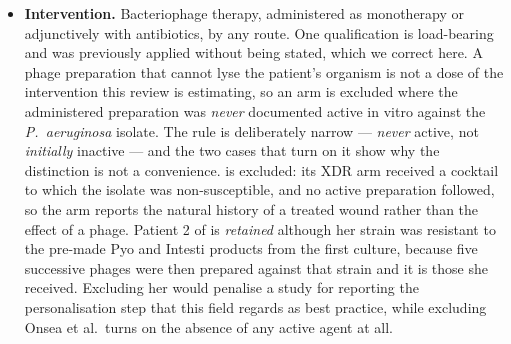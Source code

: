 \begin{itemize}
\item \textbf{Intervention.} Bacteriophage therapy, administered as monotherapy or adjunctively with antibiotics, by any route. One qualification is load-bearing and was previously applied without being stated, which we correct here. A phage preparation that cannot lyse the patient's organism is not a dose of the intervention this review is estimating, so an arm is excluded where the administered preparation was \emph{never} documented active in vitro against the \textit{P.\ aeruginosa} isolate. The rule is deliberately narrow --- \emph{never} active, not \emph{initially} inactive --- and the two cases that turn on it show why the distinction is not a convenience. \textcite{Onsea2019_viruses} is excluded: its XDR arm received a cocktail to which the isolate was non-susceptible, and no active preparation followed, so the arm reports the natural history of a treated wound rather than the effect of a phage. Patient 2 of \textcite{Zaldastanishvili2021_viruses} is \emph{retained} although her strain was resistant to the pre-made Pyo and Intesti products from the first culture, because five successive phages were then prepared against that strain and it is those she received. Excluding her would penalise a study for reporting the personalisation step that this field regards as best practice, while excluding Onsea et al.\ turns on the absence of any active agent at all.


\end{itemize}
